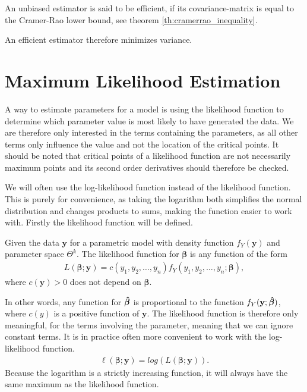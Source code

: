 \begin{definition} 
\label{def:efficient_estimator}
An unbiased estimator is said to be efficient, if its covariance-matrix is equal to the Cramer-Rao lower bound, see theorem \ref{th:cramerrao_inequality}.
\end{definition}

An efficient estimator therefore minimizes variance. 
 
\section{Maximum Likelihood Estimation}

A way to estimate parameters for a model is using the likelihood function to determine which parameter value is most likely to have generated the data. We are therefore only interested in the terms containing the parameters, as all other terms only influence the value and not the location of the critical points. It should be noted that critical points of a likelihood function are not necessarily maximum points and its second order derivatives should therefore be checked.   

We will often use the log-likelihood function instead of the likelihood function. 
This is purely for convenience, as taking the logarithm both simplifies the normal distribution and changes products to sums, making the function easier to work with. Firstly the likelihood function will be defined.

\begin{definition} 
\label{def:likelihood_function}
Given the data $\textbf{y}$ for a parametric model with density function $f_Y(\textbf{y})$ and parameter space $\Theta^k$. The likelihood function for $\boldsymbol{\beta}$ is any function of the form 
\begin{align*}
    L(\boldsymbol{\beta}; \textbf{y}) = c(y_1, y_2, \ldots, y_n)f_Y(y_1, y_2, \ldots, y_n; \boldsymbol{\beta}), 
\end{align*}
where $c(\textbf{y})>0$ does not depend on $\boldsymbol{\beta}$. 
\end{definition}

In other words, any function for $\operatorname{\boldsymbol{\hat{\beta}}}$ is proportional to the function $f_Y(\textbf{y}; \operatorname{\boldsymbol{\hat{\beta}}})$, where $c(y)$ is a positive function of $\textbf{y}$. 
The likelihood function is therefore only meaningful, for the terms involving the parameter, meaning that we can ignore constant terms. 
It is in practice often more convenient to work with the log-likelihood function. 
\begin{align*}
    \ell(\boldsymbol{\beta};\textbf{y})=log(L(\boldsymbol{\beta}; \textbf{y})).
\end{align*}
Because the logarithm is a strictly increasing function, it will always have the same maximum as the likelihood function. 

